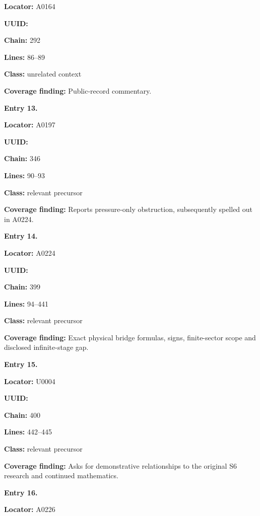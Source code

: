 \textbf{Locator:} A0164

\textbf{UUID:} \protect{}

\textbf{Chain:} 292

\textbf{Lines:} 86--89

\textbf{Class:} unrelated context

\textbf{Coverage finding:} Public-record commentary.


\textbf{Entry 13.}

\textbf{Locator:} A0197

\textbf{UUID:} \protect{}

\textbf{Chain:} 346

\textbf{Lines:} 90--93

\textbf{Class:} relevant precursor

\textbf{Coverage finding:} Reports pressure-only obstruction,
subsequently spelled out in A0224.


\textbf{Entry 14.}

\textbf{Locator:} A0224

\textbf{UUID:} \protect{}

\textbf{Chain:} 399

\textbf{Lines:} 94--441

\textbf{Class:} relevant precursor

\textbf{Coverage finding:} Exact physical bridge formulas, signs,
finite-sector scope and disclosed infinite-stage gap.


\textbf{Entry 15.}

\textbf{Locator:} U0004

\textbf{UUID:} \protect{}

\textbf{Chain:} 400

\textbf{Lines:} 442--445

\textbf{Class:} relevant precursor

\textbf{Coverage finding:} Asks for demonstrative relationships to the
original S6 research and continued mathematics.


\textbf{Entry 16.}

\textbf{Locator:} A0226

